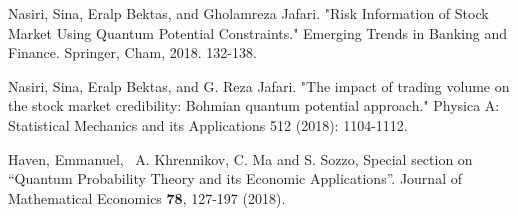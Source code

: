 \documentclass[ aip,jmp,reprint]{revtex4-2}
\begin{document}
\begin{thebibliography}{99}
 Nasiri, Sina, Eralp Bektas, and Gholamreza Jafari. "Risk
Information of Stock Market Using Quantum Potential Constraints." Emerging
Trends in Banking and Finance. Springer, Cham, 2018. 132-138.

 Nasiri, Sina, Eralp Bektas, and G. Reza Jafari. "The
impact of trading volume on the stock market credibility: Bohmian quantum
potential approach." Physica A: Statistical Mechanics and its Applications
512 (2018): 1104-1112.

 Haven, Emmanuel, \ A. Khrennikov, C. Ma and S. Sozzo,
Special section on \textquotedblleft Quantum Probability Theory and its
Economic Applications\textquotedblright. Journal of Mathematical Economics 
\textbf{78}, 127-197 (2018).
\end{thebibliography}
\end{document}
